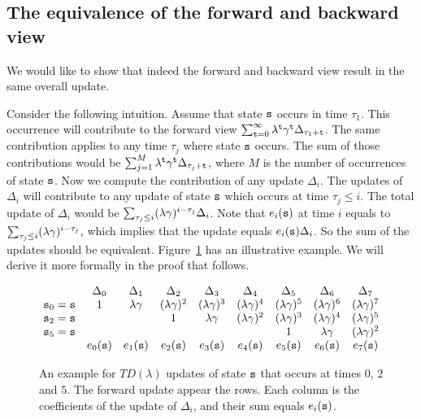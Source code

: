 \subsection{The equivalence of the forward and backward view}

We would like to show that indeed the forward and backward view result in the same overall update.

Consider the following intuition. Assume that state ${\tt s}$ occurs in time $\tau_1$. This occurrence will contribute to the forward view $\sum_{{\tt t}=0}^\infty \lambda^{\tt t}\gamma^{\tt t}\Delta_{\tau_1+{\tt t}} $.
The same contribution applies to any time $\tau_j$ where state ${\tt s}$ occurs. The sum of those contributions would be $\sum_{j=1}^M \lambda^{\tt t}\gamma^{\tt t}\Delta_{\tau_j+{\tt t}} $, where $M$ is the number of occurrences of state ${\tt s}$. Now we compute the contribution of any update $\Delta_i$. The updates of $\Delta_i$ will  contribute to any update of state ${\tt s}$ which occurs at time $\tau_j\leq i$. The total update of $\Delta_i$ would be $\sum_{\tau_j\leq i } (\lambda\gamma)^{i-\tau_j}\Delta_i $. Note that $e_i({\tt s})$ at time $i$ equals to $\sum_{\tau_j\leq i } (\lambda\gamma)^{i-\tau_j}$, which implies that the update equals $e_i({\tt s})\Delta_i$. So the sum of the updates should be equivalent. Figure~\ref{fig-TD-lambda-forward-backward} has an illustrative example.
We will derive it more formally in the proof that follows.

\begin{figure}
    \centering
  $$  
  \begin{matrix}
                & \Delta_0 & \Delta_1 & \Delta_2 & \Delta_3 &  \Delta_4 & \Delta_5 & \Delta_6 & \Delta_7 \\
{\tt s}_0={\tt s} & 1 & \lambda\gamma & (\lambda\gamma)^2 & (\lambda\gamma)^3& (\lambda\gamma)^4 & (\lambda\gamma)^5& (\lambda\gamma)^6 &(\lambda\gamma)^7\\
{\tt s}_2={\tt s} &  & & 1 & \lambda\gamma & (\lambda\gamma)^2 & (\lambda\gamma)^3& (\lambda\gamma)^4  & (\lambda\gamma)^5\\
{\tt s}_5={\tt s} &  &  & & & & 1 & \lambda\gamma & (\lambda\gamma)^2\\
 & e_0({\tt s}) & e_1({\tt s}) & e_2({\tt s})& e_3({\tt s}) & e_4({\tt s}) & e_5({\tt s}) & e_6({\tt s}) & e_7({\tt s})
\end{matrix}
$$
    \caption{An example for $TD(\lambda)$ updates of state ${\tt s}$ that occurs at times $0$, $2$ and $5$. The forward update appear the rows. Each column is  the coefficients of the update of $\Delta_i$, and their sum equals $e_i({\tt s})$.} \label{fig-TD-lambda-forward-backward}
\end{figure}


